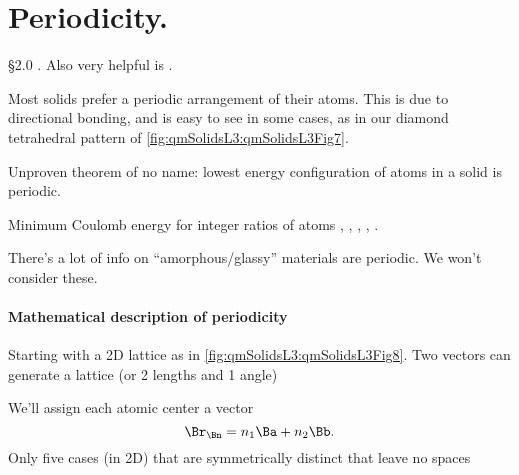 %
%
%
\section{Periodicity.}

\reading \S 2.0 \citep{ibach2009solid}.  Also very helpful is \citep{tung:bravais}.

Most solids prefer a periodic arrangement of their atoms.  This is due to directional bonding, and is easy to see in some cases, as in our diamond tetrahedral pattern of \cref{fig:qmSolidsL3:qmSolidsL3Fig7}.
%

Unproven theorem of no name: lowest energy configuration of atoms in a solid is periodic.

Minimum Coulomb energy for integer ratios of atoms
,
,
,
,
.

There's a lot of info on ``amorphous/glassy'' materials are  periodic.  We won't consider these.
%
\paragraph{Mathematical description of periodicity}

Starting with a 2D lattice as in \cref{fig:qmSolidsL3:qmSolidsL3Fig8}.  Two vectors can generate a lattice (or 2 lengths and 1 angle)
%

We'll assign each atomic center a vector
%
\begin{equation}\label{eqn:condensedMatterLecture3:100}
\Br_\Bn = n_1 \Ba + n_2 \Bb.
\end{equation}
%
Only five cases (in 2D) that are symmetrically distinct that leave no spaces


